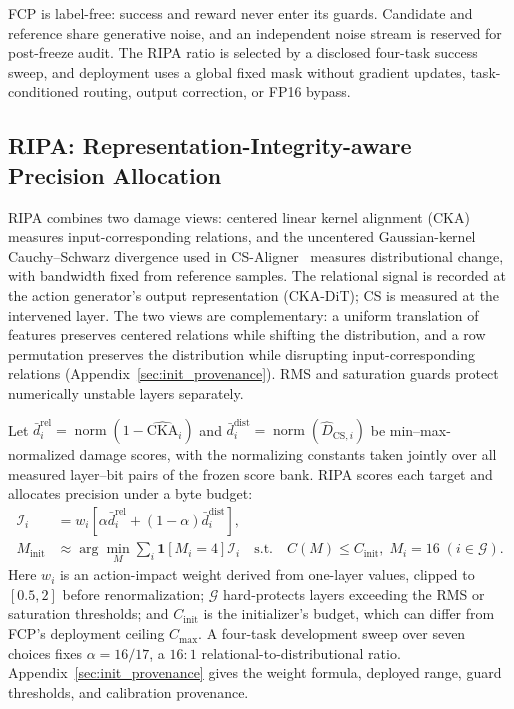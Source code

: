 FCP is label-free: success and reward never enter its guards. Candidate and reference share generative noise, and an independent noise stream is reserved for post-freeze audit. The RIPA ratio is selected by a disclosed four-task success sweep, and deployment uses a global fixed mask without gradient updates, task-conditioned routing, output correction, or FP16 bypass.

\subsection{RIPA: Representation-Integrity-aware Precision Allocation}
\label{sec:cscka}

RIPA combines two damage views: centered linear kernel alignment (CKA)~\citep{kornblith2019similarity} measures input-corresponding relations, and the uncentered Gaussian-kernel Cauchy--Schwarz divergence used in CS-Aligner~\citep{yin2026csaligner} measures distributional change, with bandwidth fixed from reference samples. The relational signal is recorded at the action generator's output representation (CKA-DiT); CS is measured at the intervened layer. The two views are complementary: a uniform translation of features preserves centered relations while shifting the distribution, and a row permutation preserves the distribution while disrupting input-corresponding relations (Appendix~\ref{sec:init_provenance}). RMS and saturation guards protect numerically unstable layers separately.

Let $\bar d_i^{\mathrm{rel}}=\operatorname{norm}(1-\widehat{\mathrm{CKA}}_i)$ and $\bar d_i^{\mathrm{dist}}=\operatorname{norm}(\widehat D_{\mathrm{CS},i})$ be min--max-normalized damage scores, with the normalizing constants taken jointly over all measured layer--bit pairs of the frozen score bank. RIPA scores each target and allocates precision under a byte budget:
\begin{equation}
 \begin{aligned}
 \mathcal I_i&=w_i\left[\alpha\bar d_i^{\mathrm{rel}}+(1-\alpha)\bar d_i^{\mathrm{dist}}\right],\\
 M_{\mathrm{init}}&\approx\arg\min_M\sum_i\mathbf{1}[M_i=4]\mathcal I_i
 \quad\mathrm{s.t.}\quad C(M)\le C_{\mathrm{init}},\;M_i=16\;(i\in\mathcal G).
 \end{aligned}
 \label{eq:cscka_allocator}
\end{equation}
Here $w_i$ is an action-impact weight derived from one-layer \dfunc values, clipped to $[0.5,2]$ before renormalization; $\mathcal G$ hard-protects layers exceeding the RMS or saturation thresholds; and $C_{\mathrm{init}}$ is the initializer's budget, which can differ from FCP's deployment ceiling $C_{\max}$. A four-task development sweep over seven choices fixes $\alpha=16/17$, a $16{:}1$ relational-to-distributional ratio. Appendix~\ref{sec:init_provenance} gives the weight formula, deployed range, guard thresholds, and calibration provenance.

